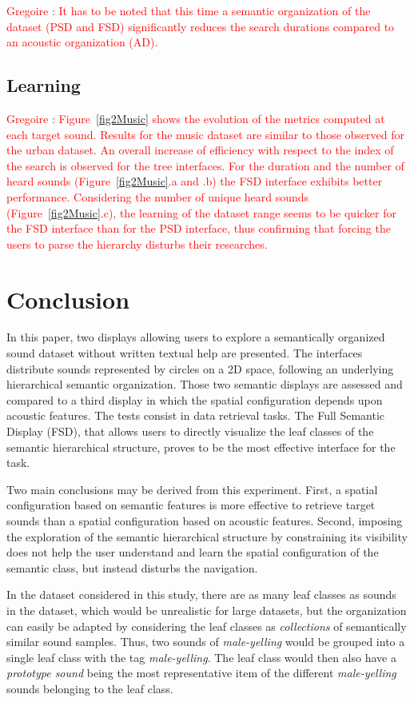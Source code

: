 \documentclass{aes2e}
\newcommand{\gl}[1]{\textcolor{red}{Gregoire : #1}}
\begin{document}
\gl{It has to be noted that this time a semantic organization of the dataset (PSD and FSD) significantly reduces the search durations compared to an acoustic organization (AD).}

\subsection{Learning}

\gl{Figure~\ref{fig2Music} shows the evolution of the metrics computed at each target sound. Results for the music dataset are similar to those observed for the urban dataset. An overall increase of efficiency with respect to the index of the search is observed for the tree interfaces. For the duration and the number of heard sounds (Figure~\ref{fig2Music}.a and .b) the FSD interface exhibits better performance. Considering the number of unique heard sounds (Figure~\ref{fig2Music}.c), the learning of the dataset range seems to be quicker for the FSD interface than for the PSD interface, thus confirming that forcing the users to parse the hierarchy disturbs their researches.}

\section{Conclusion}

In this paper, two displays allowing users to explore a semantically organized sound dataset without written textual help are presented. The interfaces distribute sounds represented by circles on a 2D space, following an underlying hierarchical semantic organization. Those two semantic displays are assessed and compared to a third display in which the spatial configuration depends upon acoustic features. The tests consist in data retrieval tasks. 
The Full Semantic Display (FSD), that allows users to directly visualize the leaf classes of the semantic hierarchical structure, proves to be the most effective interface for the task.

Two main conclusions may be derived from this experiment. First, a spatial configuration based on semantic features is more effective to retrieve target sounds than a spatial configuration based on acoustic features. Second, imposing the exploration of the semantic hierarchical structure by constraining its visibility does not help the user understand and learn the spatial configuration of the semantic class, but instead disturbs the navigation. 

In the dataset considered in this study, there are as many leaf classes as sounds in the dataset, which would be unrealistic for large datasets, but the organization can easily be adapted by considering the leaf classes as \textit{collections} of semantically similar sound samples. Thus, two sounds of \textit{male-yelling} would be grouped into a single leaf class with the tag \textit{male-yelling}. The leaf class would then also have a \textit{prototype sound} being the most representative item of the different \textit{male-yelling} sounds belonging to the leaf class.
\end{document}
